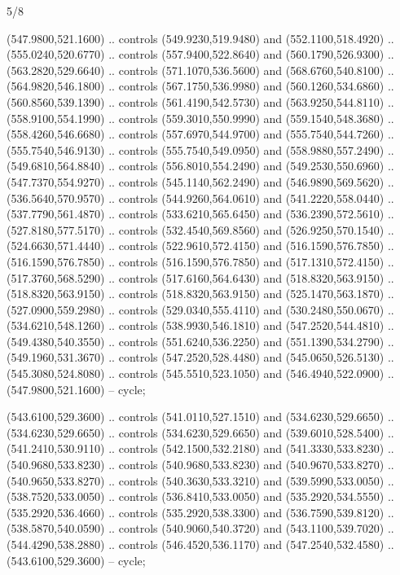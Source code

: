 \begin{flagdescription}{5/8}
\begin{scope}[shift={(m)}]
\begin{scope}[scale=\flagwidth/220,y=0.1mm, x=0.1mm, yscale=-1,shift={(-596,-360)}]
\begin{scope}[cm={{-1.0,0.0,0.0,1.0,(1193.9797,0.0)}}]
\begin{scope}[draw=black,line join=round,line cap=round,line width=0.381\lw]
\begin{scope}[line width=0.534\lw,fill=green]
 (547.9800,521.1600) .. controls (549.9230,519.9480) and
  (552.1100,518.4920) .. (555.0240,520.6770) .. controls (557.9400,522.8640) and
  (560.1790,526.9300) .. (563.2820,529.6640) .. controls (571.1070,536.5600) and
  (568.6760,540.8100) .. (564.9820,546.1800) .. controls (567.1750,536.9980) and
  (560.1260,534.6860) .. (560.8560,539.1390) .. controls (561.4190,542.5730) and
  (563.9250,544.8110) .. (558.9100,554.1990) .. controls (559.3010,550.9990) and
  (559.1540,548.3680) .. (558.4260,546.6680) .. controls (557.6970,544.9700) and
  (555.7540,544.7260) .. (555.7540,546.9130) .. controls (555.7540,549.0950) and
  (558.9880,557.2490) .. (549.6810,564.8840) .. controls (556.8010,554.2490) and
  (549.2530,550.6960) .. (547.7370,554.9270) .. controls (545.1140,562.2490) and
  (546.9890,569.5620) .. (536.5640,570.9570) .. controls (544.9260,564.0610) and
  (541.2220,558.0440) .. (537.7790,561.4870) .. controls (533.6210,565.6450) and
  (536.2390,572.5610) .. (527.8180,577.5170) .. controls (532.4540,569.8560) and
  (526.9250,570.1540) .. (524.6630,571.4440) .. controls (522.9610,572.4150) and
  (516.1590,576.7850) .. (516.1590,576.7850) .. controls (516.1590,576.7850) and
  (517.1310,572.4150) .. (517.3760,568.5290) .. controls (517.6160,564.6430) and
  (518.8320,563.9150) .. (518.8320,563.9150) .. controls (518.8320,563.9150) and
  (525.1470,563.1870) .. (527.0900,559.2980) .. controls (529.0340,555.4110) and
  (530.2480,550.0670) .. (534.6210,548.1260) .. controls (538.9930,546.1810) and
  (547.2520,544.4810) .. (549.4380,540.3550) .. controls (551.6240,536.2250) and
  (551.1390,534.2790) .. (549.1960,531.3670) .. controls (547.2520,528.4480) and
  (545.0650,526.5130) .. (545.3080,524.8080) .. controls (545.5510,523.1050) and
  (546.4940,522.0900) .. (547.9800,521.1600) -- cycle;

 (543.6100,529.3600) .. controls (541.0110,527.1510) and
  (534.6230,529.6650) .. (534.6230,529.6650) .. controls (534.6230,529.6650) and
  (539.6010,528.5400) .. (541.2410,530.9110) .. controls (542.1500,532.2180) and
  (541.3330,533.8230) .. (540.9680,533.8230) .. controls (540.9680,533.8230) and
  (540.9670,533.8270) .. (540.9650,533.8270) .. controls (540.3630,533.3210) and
  (539.5990,533.0050) .. (538.7520,533.0050) .. controls (536.8410,533.0050) and
  (535.2920,534.5550) .. (535.2920,536.4660) .. controls (535.2920,538.3300) and
  (536.7590,539.8120) .. (538.5870,540.0590) .. controls (540.9060,540.3720) and
  (543.1100,539.7020) .. (544.4290,538.2880) .. controls (546.4520,536.1170) and
  (547.2540,532.4580) .. (543.6100,529.3600) -- cycle;


\end{scope}
\end{scope}
\end{scope}
\end{scope}
\end{scope}
\end{flagdescription}
